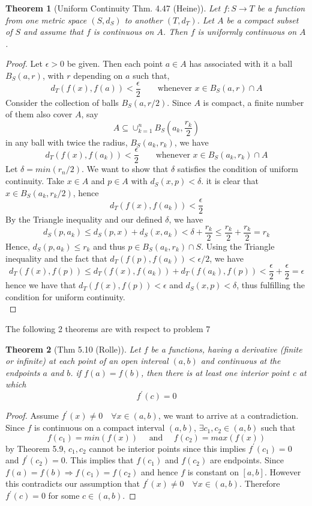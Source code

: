 \documentclass[aps,pra,notitlepage,amsmath,amssymb,letterpaper,12pt]{revtex4-1}
\newtheorem{theorem}{Theorem}
\begin{document}
\begin{theorem}[Uniform Continuity Thm. 4.47 (Heine)]
Let $f:S \to T$ be a function from one metric space $(S,d_{S})$ to another $(T,d_{T})$. Let $A$ be a compact subset of $S$ and assume that $f$ is continuous on $A$. Then $f$ is uniformly continuous on $A$.
\end{theorem}
\begin{proof}
Let $\epsilon > 0$ be given. Then each point $a \in A$ has associated with it a ball  $B_{S}(a,r)$, with $r$ depending on $a$ such that,
$$d_{T}(f(x),f(a)) < \frac{\epsilon}{2} \qquad \textrm{whenever } x\in B_{S}(a,r)\cap A$$
Consider the collection of balls $B_{S}(a,r/2)$. Since $A$ is compact, a finite number of them also cover $A$, say
$$ A \subseteq \cup_{k=1}^{n} B_{S}(a_{k},\frac{r_{k}}{2})  $$
in any ball with twice the radius, $B_{S}(a_{k},r_{k})$, we have
$$d_{T}(f(x),f(a_{k})) < \frac{\epsilon}{2} \qquad \textrm{whenever } x\in B_{S}(a_{k},r_{k}) \cap A$$
Let $\delta = min(r_{n}/2)$. We want to show that $\delta$ satisfies the condition of uniform continuity. Take $x \in A$ and $p \in A$ with $d_{S}(x,p) < \delta$. it is clear that $x \in B_{S}(a_{k},r_{k}/2)$, hence
$$ d_{T}(f(x),f(a_{k})) < \frac{\epsilon}{2} $$
By the Triangle inequality and our defined $\delta$, we have
$$d_{S}(p,a_{k}) \leq d_{S}(p,x) + d_{S}(x,a_{k}) < \delta + \frac{r_{k}}{2} \leq \frac{r_{k}}{2} + \frac{r_{k}}{2} = r_{k}$$
Hence, $d_{S}(p,a_{k}) \leq r_{k}$ and thus $p \in B_{S}(a_{k},r_{k}) \cap S$. Using the Triangle inequality and the fact that $d_{T}(f(p),f(a_{k})) < \epsilon /2$, we have
$$d_{T}(f(x),f(p)) \leq d_{T}(f(x),f(a_{k})) + d_{T}(f(a_{k}), f(p)) < \frac{\epsilon}{2} + \frac{\epsilon}{2} = \epsilon$$
hence we have that $d_{T}(f(x),f(p)) < \epsilon$ and $d_{S}(x,p) < \delta$, thus fulfilling the condition for uniform continuity.
$$ $$
\end{proof}

The following 2 theorems are with respect to problem 7
\begin{theorem}[Thm 5.10 (Rolle)]
Let $f$ be a functions, having a derivative (finite or infinite) at each point
of an open interval $(a,b)$ and continuous at the endpoints $a$ and $b$. if $f(a)=f(b)$, then there is at least one interior point c at which
\[f^\prime(c) = 0\]
\end{theorem}
\begin{proof}
Assume $f^\prime(x) \neq 0 \quad \forall x \in (a,b)$, we want to arrive at a contradiction. Since $f$ is continuous on a compact interval $(a,b)$, $\exists c_{1},c_{2} \in (a,b)$ such that $$f(c_{1}) = min(f(x)) \quad \textrm{ and } \quad f(c_{2}) = max(f(x))$$
by Theorem 5.9, $c_{1}, c_{2}$ cannot be interior points since this implies $f^\prime(c_{1}) = 0$ and $f^\prime(c_{2}) = 0$. This implies that $f(c_{1})$ and $f(c_{2})$ are endpoints. Since $f(a) = f(b) \Rightarrow f(c_{1}) = f(c_{2})$ and hence $f$ is constant on $[a,b]$. However this contradicts our assumption that $f^\prime(x) \neq 0 \quad \forall x \in (a,b)$. Therefore $f^\prime(c) = 0$ for some $c \in (a,b)$.
\end{proof}
\end{document}
